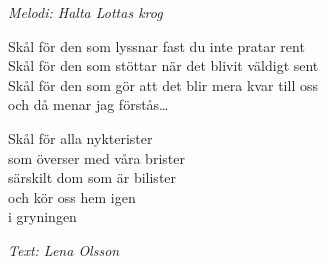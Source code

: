 {\footnotesize\textit{Melodi: Halta Lottas krog}}\par
\vspace{10pt}
Skål för den som lyssnar fast du inte pratar rent\\
Skål för den som stöttar när det blivit väldigt sent\\
Skål för den som gör att det blir mera kvar till oss\\
och då menar jag förstås…\par
\vspace{10pt}
Skål för alla nykterister\\
som överser med våra brister\\
särskilt dom som är bilister\\
och kör oss hem igen\\
i gryningen
\par
\vspace{10pt}
{\footnotesize\textit{Text: Lena Olsson}}
